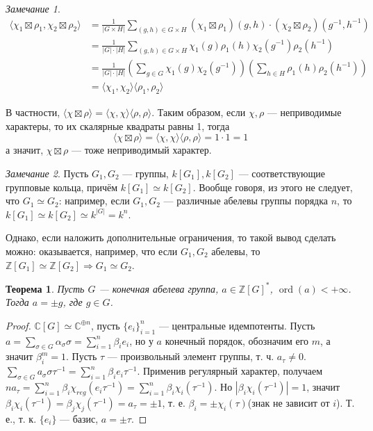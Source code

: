 \documentclass{article}
\newtheorem*{theorem}{Теорема}
\theoremstyle{definition}
\theoremstyle{remark}
\newtheorem*{remark}{Замечание}
\DeclareMathOperator{\ord}{ord}
\newcommand{\Ra}{\Rightarrow}
\newcommand{\Z}{\mathbb{Z}}
\renewcommand{\C}{\mathbb{C}}
\begin{document}
\begin{remark}
    \begin{align*}
        \langle \chi_1 \boxtimes \rho_1, \chi_2 \boxtimes \rho_2 \rangle &= \frac{1}{|G \times H|} \sum_{(g, h) \in G \times H} (\chi_1 \boxtimes \rho_1)(g, h) \cdot (\chi_2 \boxtimes \rho_2)(g^{-1}, h^{-1}) \\
        &= \frac{1}{|G| \cdot |H|} \sum_{(g, h) \in G \times H} \chi_1(g) \rho_1(h) \chi_2(g^{-1}) \rho_2(h^{-1}) \\
        &= \frac{1}{|G| \cdot |H|} \left( \sum_{g \in G} \chi_1(g) \chi_2(g^{-1}) \right) \left( \sum_{h \in H} \rho_1(h) \rho_2(h^{-1}) \right) \\
        &= \langle \chi_1, \chi_2 \rangle \langle \rho_1, \rho_2 \rangle
    \end{align*}

    В частности, $\langle \chi \boxtimes \rho \rangle = \langle \chi, \chi \rangle \langle \rho, \rho \rangle$. Таким образом, если $\chi, \rho$ --- неприводимые характеры, то их скалярные квадраты равны 1, тогда
    \begin{equation*}
        \langle \chi \boxtimes \rho \rangle = \langle \chi, \chi \rangle \langle \rho, \rho \rangle = 1 \cdot 1 = 1
    \end{equation*}
    а значит, $\chi \boxtimes \rho$ --- тоже неприводимый характер.
\end{remark}


\begin{remark}
    Пусть $G_1, G_2$ --- группы, $k[G_1], k[G_2]$ --- соответствующие групповые кольца, причём $k[G_1] \simeq k[G_2]$. Вообще говоря, из этого не следует, что $G_1 \simeq G_2$: например, если $G_1, G_2$ --- различные абелевы группы порядка $n$, то $k[G_1] \simeq k[G_2] \simeq k^{|G|} = k^n$.

    Однако, если наложить дополнительные ограничения, то такой вывод сделать можно: оказывается, например, что если $G_1, G_2$ абелевы, то $\Z[G_1] \simeq \Z[G_2] \Ra G_1 \simeq G_2$.
\end{remark}

\begin{theorem}
    Пусть $G$ --- конечная абелева группа, $a \in \Z[G]^*$, $\ord(a) < +\infty$. Тогда $a = \pm g$, где $g \in G$.
\end{theorem}
\begin{proof}
	$\C[G] \simeq \C^{\oplus n}$, пусть $\{e_i\}_{i = 1}^n$ --- центральные идемпотенты. Пусть $a = \sum\limits_{\sigma \in G} \alpha_\sigma \sigma = \sum\limits_{i = 1}^n \beta_i e_i$, но у $a$ конечный порядок, обозначим его $m$, а значит $\beta_i^m = 1$. Пусть $\tau$ --- произвольный элемент группы, т. ч. $a_\tau \neq 0$. $\sum\limits_{\sigma \in G} a_\sigma \sigma \tau^{-1}  = \sum\limits_{i = 1}^n \beta_i e_i \tau^{-1}$. Применив регулярный характер, получаем $na_\tau = \sum\limits_{i = 1}^n \beta_i \chi_{reg}(e_i\tau^{-1}) = \sum\limits_{i = 1}^n \beta_i \chi_i(\tau^{-1})$. Но $|\beta_i \chi_i(\tau^{-1})| =  1$, значит $\beta_i \chi_i(\tau^{-1}) = \beta_j \chi_j(\tau^{-1}) = a_\tau = \pm 1$, т. е. $\beta_i = \pm \chi_i(\tau)$(знак не зависит от $i$). Т. е., т. к. $\{e_i\}$ --- базис, $a = \pm \tau$.
\end{proof}
\end{document}
